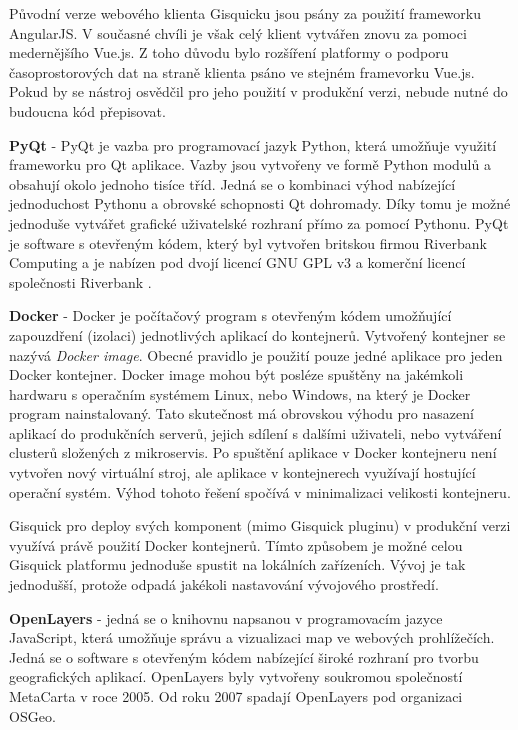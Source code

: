 Původní verze webového klienta Gisquicku jsou psány za použití frameworku AngularJS. V současné chvíli je však celý klient vytvářen znovu za pomoci medernějšího Vue.js. Z toho důvodu bylo rozšíření platformy o podporu časoprostorových dat na straně klienta psáno ve stejném framevorku Vue.js. Pokud by se nástroj osvědčil pro jeho použití v produkční verzi, nebude nutné do budoucna kód přepisovat.

\newpage
\bigskip
\noindent
\textbf{PyQt} - PyQt je vazba pro programovací jazyk Python, která umožňuje využití frameworku pro Qt aplikace. Vazby jsou vytvořeny ve formě Python modulů a obsahují okolo jednoho tisíce tříd. Jedná se o kombinaci výhod nabízející jednoduchost Pythonu a obrovské schopnosti Qt dohromady. Díky tomu je možné jednoduše vytvářet grafické uživatelské rozhraní přímo za pomocí Pythonu. PyQt je software s otevřeným kódem, který byl vytvořen britskou firmou Riverbank Computing a je nabízen pod dvojí licencí GNU GPL v3 a komerční licencí společnosti Riverbank \cite{pyqt}.

\bigskip
\noindent
\textbf{Docker} - Docker je počítačový program s otevřeným kódem umožňující zapouzdření (izolaci) jednotlivých aplikací do kontejnerů. Vytvořený kontejner se nazývá \textit{Docker image}. Obecné pravidlo je použití pouze jedné aplikace pro jeden Docker kontejner. Docker image mohou být posléze spuštěny na jakémkoli hardwaru s operačním systémem Linux, nebo Windows, na který je Docker program nainstalovaný. Tato skutečnost má obrovskou výhodu pro nasazení aplikací do produkčních serverů, jejich sdílení s dalšími uživateli, nebo vytváření clusterů složených z mikroservis. Po spuštění aplikace v Docker kontejneru není vytvořen nový virtuální stroj, ale aplikace v kontejnerech využívají hostující operační systém. Výhod tohoto řešení spočívá v minimalizaci velikosti kontejneru.

Gisquick pro deploy svých komponent (mimo Gisquick pluginu) v produkční verzi využívá právě použití Docker kontejnerů. Tímto způsobem je možné celou Gisquick platformu jednoduše spustit na lokálních zařízeních. Vývoj je tak jednodušší, protože odpadá jakékoli nastavování vývojového prostředí. 

\bigskip
\noindent
\textbf{OpenLayers} - jedná se o knihovnu napsanou v programovacím jazyce JavaScript, která umožňuje správu a vizualizaci map ve webových prohlížečích. Jedná se o software s otevřeným kódem nabízející široké rozhraní pro tvorbu geografických aplikací. OpenLayers byly vytvořeny soukromou společností MetaCarta v roce 2005. Od roku 2007 spadají OpenLayers pod organizaci OSGeo.

